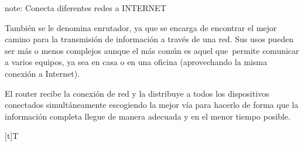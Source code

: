 \documentclass[letterpaper,10pt,spanish]{sphinxmanual}
\let\sphinxpxdimen\pdfpxdimen\else\newdimen\sphinxpxdimen
\begin{document}
\begin{sphinxadmonition}{note}{: Conecta diferentes redes a INTERNET}

\sphinxAtStartPar
También se le denomina enrutador, ya que se encarga de encontrar el mejor camino para la transmisión de información a través de una red. Sus usos pueden ser más o menos complejos aunque el más común es aquel que permite comunicar a varios equipos, ya sea en casa o en una oficina (aprovechando la misma conexión a Internet).

\sphinxAtStartPar
El router recibe la conexión de red y la distribuye a todos los dispositivos conectados simultáneamente escogiendo la mejor vía para hacerlo de forma que la información completa llegue de manera adecuada y en el menor tiempo posible.


\begin{savenotes}\sphinxattablestart
\sphinxthistablewithglobalstyle
\centering
\begin{tabulary}{\linewidth}[t]{T}
\sphinxtoprule
\sphinxtableatstartofbodyhook

\begin{sphinxfigure-in-table}
\centering
\capstart
\noindent\sphinxincludegraphics[width=400\sphinxpxdimen]{{image081}.png}
\label{\detokenize{1_guias/10informatica/G1003:id8}}\end{sphinxfigure-in-table}\relax
\\
\sphinxbottomrule
\end{tabulary}
\sphinxtableafterendhook\par
\sphinxattableend\end{savenotes}
\end{sphinxadmonition}
\end{document}
